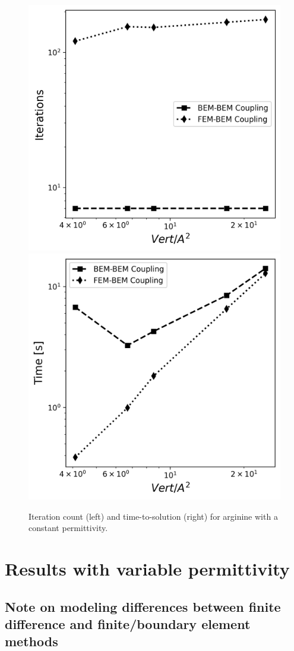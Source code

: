 \begin{figure}
\centering
   \includegraphics[width=0.45\linewidth]{DolfinX_Arginine2_const_coeff_iter.png}
  \includegraphics[width=0.45\linewidth]{DolfinX_Arginine2_const_coeff_total_time.png}
  \caption{Iteration count (left) and time-to-solution (right) for arginine with a constant permittivity.  }
\label{fig:arg2_constant_time_iter}
\end{figure}


\section*{\sffamily \Large Results with variable permittivity}

\subsection*{\sffamily \large Note on modeling differences between finite difference and finite/boundary element methods}

